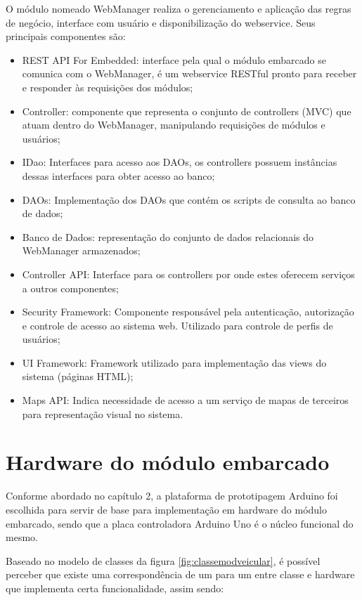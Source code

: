 O módulo nomeado WebManager realiza o gerenciamento e aplicação das regras de negócio, interface com usuário e disponibilização do webservice. Seus principais componentes são:

\begin{itemize}
	\item REST API For Embedded: interface pela qual o módulo embarcado se comunica com o WebManager, é um webservice RESTful pronto para receber e responder às requisições dos módulos;
	\item Controller: componente que representa o conjunto de controllers (MVC) que atuam dentro do WebManager, manipulando requisições de módulos e usuários;
	\item IDao: Interfaces para acesso aos DAOs, os controllers possuem instâncias dessas interfaces para obter acesso ao banco;
	\item DAOs: Implementação dos DAOs que contém os scripts de consulta ao banco de dados;
	\item Banco de Dados: representação do conjunto de dados relacionais do WebManager armazenados;
	\item Controller API: Interface para os controllers por onde estes oferecem serviços a outros componentes;
	\item Security Framework: Componente responsável pela autenticação, autorização e controle de acesso ao sistema web. Utilizado para controle de perfis de usuários;
	\item UI Framework: Framework utilizado para implementação das views do sistema (páginas HTML);
	\item Maps API: Indica necessidade de acesso a um serviço de mapas de terceiros para representação visual no sistema.
\end{itemize}

\section{Hardware do módulo embarcado}

Conforme abordado no capítulo 2, a plataforma de prototipagem Arduino foi escolhida para servir de base para implementação em hardware do módulo embarcado, sendo que a placa controladora Arduino Uno é o núcleo funcional do mesmo. 

Baseado no modelo de classes da figura \ref{fig:classemodveicular}, é possível perceber que existe uma correspondência de um para um entre classe e hardware que implementa certa funcionalidade, assim sendo:

